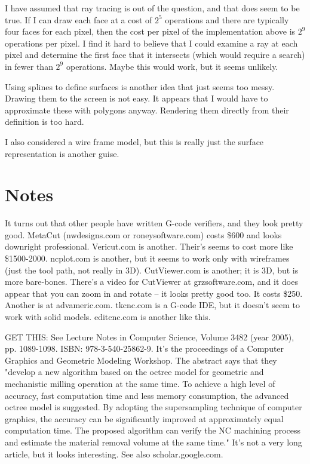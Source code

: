 \documentclass[titlepage,oneside,10pt]{article}
\begin{document}
I have assumed that ray tracing is out of the question, and that does
seem to be true. If I can draw each face at a cost of $2^5$ operations
and there are typically four faces for each pixel, then the cost per
pixel of the implementation above is $2^9$ operations per pixel. I
find it hard to believe that I could examine a ray at each pixel and
determine the first face that it intersects (which would require
a search) in fewer than $2^9$ operations. Maybe this would work, but
it seems unlikely.

Using splines to define surfaces is another idea that just seems too
messy. Drawing them to the screen is not easy. It appears that I would
have to approximate these with polygons anyway. Rendering them
directly from their definition is too hard.

I also considered a wire frame model, but this is really just the
surface representation is another guise.


\section{Notes}

It turns out that other people have written G-code verifiers, and they look
pretty good. MetaCut (nwdesigns.com or roneysoftware.com) costs \$600 and looks
downright professional. Vericut.com is another. Their's seems to cost
more like \$1500-2000. ncplot.com is another, but it seems to work
only with wireframes (just the tool path, not really in
3D). CutViewer.com is another; it is 3D, but is more
bare-bones. There's a video for CutViewer at grzsoftware.com, and 
it does appear that you can zoom in and rotate -- it looks pretty good too. It 
costs \$250. Another is at advameric.com. tkcnc.com is a G-code IDE, but it
doesn't seem to work with solid models. editcnc.com is another like this.

GET THIS: See Lecture Notes in Computer Science, Volume 3482 (year 2005), 
pp. 1089-1098. ISBN:  978-3-540-25862-9. It's the proceedings of a Computer
Graphics and Geometric Modeling Workshop. The abstract says that they
"develop a new algorithm based on the octree model for geometric and 
mechanistic milling operation at the same time. To achieve a high level of 
accuracy, fast computation time and less memory consumption, the advanced 
octree model is suggested. By adopting the supersampling technique of computer 
graphics, the accuracy can be significantly improved at approximately equal 
computation time. The proposed algorithm can verify the NC machining process 
and estimate the material removal volume at the same time." It's not a very 
long article, but it looks interesting. See also scholar.google.com.
\end{document}
